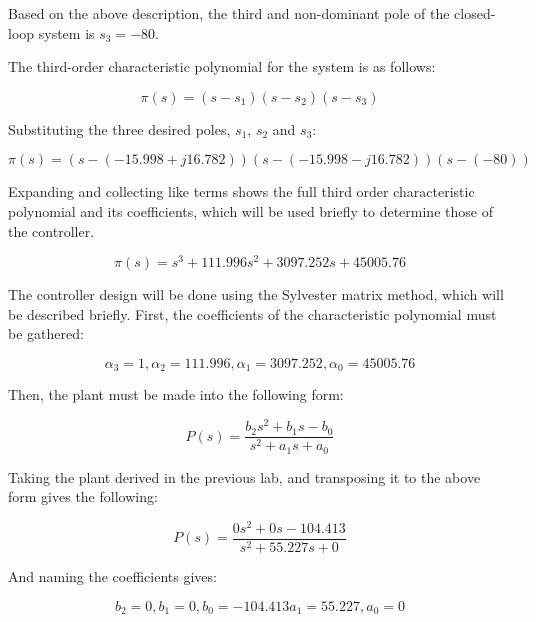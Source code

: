 \documentclass[11pt, letterpaper]{article}
\begin{document}
Based on the above description, the third and non-dominant pole of the closed-loop system is
$s_3 = -80$. \par

The third-order characteristic polynomial for the system is as follows:

\begin{equation}
    \pi(s) = (s - s_1)(s - s_2)(s - s_3)
\end{equation}

Substituting the three desired poles, $s_1$, $s_2$ and $s_3$:

\begin{equation}
    \pi(s) = (s - (-15.998 + j16.782))(s - (-15.998 - j16.782))(s - (-80))
\end{equation}

Expanding and collecting like terms shows the full third order characteristic polynomial
and its coefficients, which will be used briefly to determine those of the controller.

\begin{equation}
    \pi(s) = s^3 + 111.996s^2 + 3097.252s + 45005.76
\end{equation}

The controller design will be done using the Sylvester matrix method, which will be described
briefly. First, the coefficients of the characteristic polynomial must be gathered:

\begin{equation}
    \alpha_3 = 1, \alpha_2 = 111.996, \alpha_1 = 3097.252, \alpha_0 = 45005.76
\end{equation}

Then, the plant must be made into the following form:

\begin{equation}
    P(s) = \frac{b_2 s^2 + b_1 s - b_0}{s^2 + a_1 s + a_0}
\end{equation}

Taking the plant derived in the previous lab, and transposing it to the above form gives the following:

\begin{equation}
    P(s) = \frac{0 s^2 + 0 s - 104.413}{s^2 + 55.227s + 0}
\end{equation}

And naming the coefficients gives:

\begin{equation}
    b_2 = 0, b_1 = 0, b_0 = -104.413
    a_1 = 55.227, a_0 = 0
\end{equation}
\end{document}
